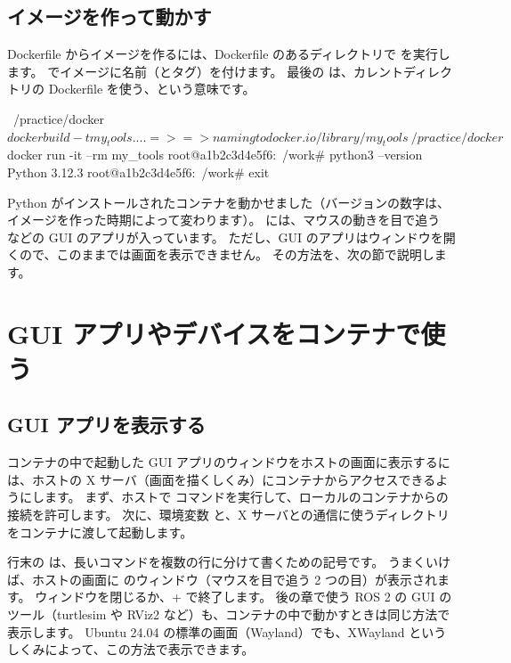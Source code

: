 \subsection{イメージを作って動かす}

Dockerfile からイメージを作るには、Dockerfile のあるディレクトリで  を実行します。
 でイメージに名前（とタグ）を付けます。
最後の  は、カレントディレクトリの Dockerfile を使う、という意味です。

\begin{terminal}[イメージを作る]
~/practice/docker$ docker build -t my_tools .
...
 => => naming to docker.io/library/my_tools
~/practice/docker$ docker run -it --rm my_tools
root@a1b2c3d4e5f6:~/work# python3 --version
Python 3.12.3
root@a1b2c3d4e5f6:~/work# exit
\end{terminal}

Python がインストールされたコンテナを動かせました（バージョンの数字は、イメージを作った時期によって変わります）。
 には、マウスの動きを目で追う  などの GUI のアプリが入っています。
ただし、GUI のアプリはウィンドウを開くので、このままでは画面を表示できません。
その方法を、次の節で説明します。

\section{GUI アプリやデバイスをコンテナで使う}
\label{sec:docker-gui-device}

\subsection{GUI アプリを表示する}

コンテナの中で起動した GUI アプリのウィンドウをホストの画面に表示するには、ホストの X サーバ（画面を描くしくみ）にコンテナからアクセスできるようにします。
まず、ホストで  コマンドを実行して、ローカルのコンテナからの接続を許可します。
次に、環境変数  と、X サーバとの通信に使うディレクトリをコンテナに渡して起動します。


行末の \cmd{\textbackslash} は、長いコマンドを複数の行に分けて書くための記号です。
うまくいけば、ホストの画面に  のウィンドウ（マウスを目で追う 2 つの目）が表示されます。
ウィンドウを閉じるか、+ で終了します。
後の章で使う ROS 2 の GUI のツール（turtlesim や RViz2 など）も、コンテナの中で動かすときは同じ方法で表示します。
Ubuntu 24.04 の標準の画面（Wayland）でも、XWayland というしくみによって、この方法で表示できます。

